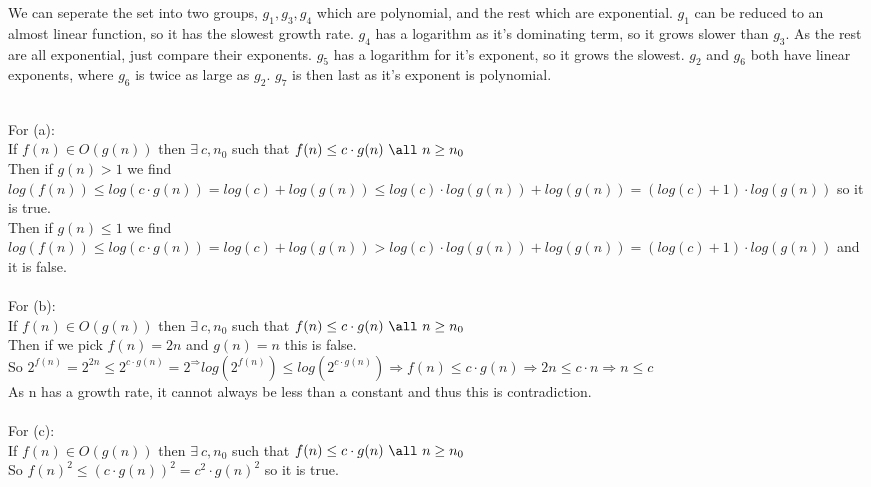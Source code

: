 \documentclass{assignment}
\begin{document}
\begin{problemlist}
\begin{answer}
We can seperate the set into two groups, $g_1,g_3,g_4$ which are polynomial, and the rest which are exponential. $g_1$ can be reduced to an almost linear function, so it has the slowest growth rate. $g_4$ has a logarithm as it's dominating term, so it grows slower than $g_3$. As the rest are all exponential, just compare their exponents. $g_5$ has a logarithm for it's exponent, so it grows the slowest. $g_2$ and $g_6$ both have linear exponents, where $g_6$ is twice as large as $g_2$. $g_7$ is then last as it's exponent is polynomial.\\ 
\end{answer}
\pbitem
\begin{problem}
\end{problem}
\begin{answer}
\\
For (a):\\
If $f(n)\in O(g(n))$ then $\exists~c,n_0$ such that $f(n) \le c\cdot g(n)~\all~n\ge n_0$\\
Then if $g(n)> 1$ we find $log(f(n))\le log(c\cdot g(n)) = log(c) + log(g(n)) \le log(c)\cdot log(g(n)) + log(g(n)) = (log(c) + 1)\cdot log(g(n))$ so it is true.\\
Then if $g(n)\le 1$ we find $log(f(n))\le log(c\cdot g(n)) = log(c) + log(g(n)) > log(c)\cdot log(g(n)) + log(g(n)) = (log(c) + 1)\cdot log(g(n))$ and it is false.\\
\\For (b):\\
If $f(n)\in O(g(n))$ then $\exists~c,n_0$ such that $f(n) \le c\cdot g(n)~\all~n\ge n_0$\\
Then if we pick $f(n) = 2n$ and $g(n) = n$ this is false.\\
So $2^{f(n)} = 2^{2n} \le 2^{c\cdot g(n)} = 2^ \Rightarrow log(2^{f(n)}) \le log(2^{c\cdot g(n)}) \Rightarrow f(n) \le c\cdot g(n) \Rightarrow 2n \le c\cdot n \Rightarrow n \le c$\\
As n has a growth rate, it cannot always be less than a constant and thus this is contradiction.\\
\\For (c):\\
If $f(n)\in O(g(n))$ then $\exists~c,n_0$ such that $f(n) \le c\cdot g(n)~\all~n\ge n_0$\\
So $f(n)^2 \le (c\cdot g(n))^2 = c^2\cdot g(n)^2$ so it is true.\\
\end{answer}
\pbitem
\begin{problem}
\end{problem}

\end{problemlist}
\end{document}
